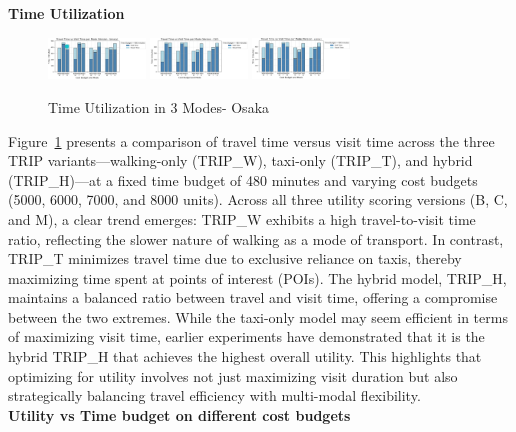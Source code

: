 \noindent\textbf{Time Utilization}

\begin{figure}[H]
\includegraphics[width=0.23\textwidth]{plots/TIME_UTILIZATION_BINARY.png}
\includegraphics[width=0.23\textwidth]{plots/TIME_UTILIZATION_CLF.png}
\centering
\includegraphics[width=0.23\textwidth]{plots/TIME_UTILIZATION_SLABS.png}
\caption{Time Utilization in 3 Modes- Osaka}
\label{fig:TimeUtilization}
\end{figure}

Figure~\ref{fig:TimeUtilization} presents a comparison of travel time versus visit time across the three TRIP variants---walking-only (TRIP\_W), taxi-only (TRIP\_T), and hybrid (TRIP\_H)---at a fixed time budget of 480 minutes and varying cost budgets (5000, 6000, 7000, and 8000 units). Across all three utility scoring versions (B, C, and M), a clear trend emerges: TRIP\_W exhibits a high travel-to-visit time ratio, reflecting the slower nature of walking as a mode of transport. In contrast, TRIP\_T minimizes travel time due to exclusive reliance on taxis, thereby maximizing time spent at points of interest (POIs). The hybrid model, TRIP\_H, maintains a balanced ratio between travel and visit time, offering a compromise between the two extremes. While the taxi-only model may seem efficient in terms of maximizing visit time, earlier experiments have demonstrated that it is the hybrid TRIP\_H that achieves the highest overall utility. This highlights that optimizing for utility involves not just maximizing visit duration but also strategically balancing travel efficiency with multi-modal flexibility.\\

\noindent\textbf{Utility vs Time budget on different cost budgets}

